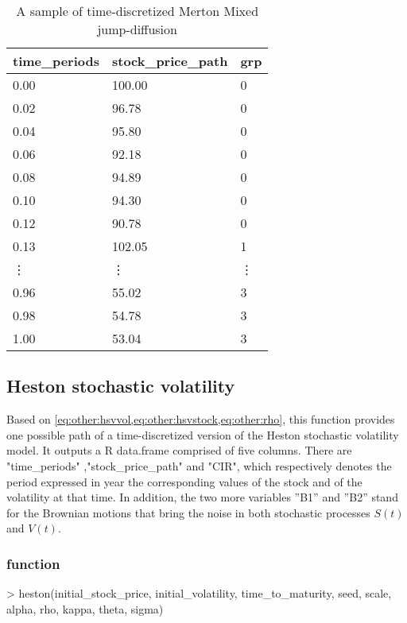 \documentclass[12pt]{report}
\begin{document}
\begin{appendices}
\begin{table}[ht]
\centering
\begin{tabular}{lll}
  \hline
 time\_periods & stock\_price\_path &  grp \\ 
  \hline
   0.00 &100.00 &  0 \\ 
   0.02 &96.78  &  0 \\ 
   0.04 &95.80  &  0 \\ 
   0.06 &92.18  &  0 \\ 
   0.08 &94.89  &  0 \\ 
   0.10 &94.30  &  0 \\ 
   0.12 &90.78  &  0 \\ 
   0.13 &102.05 &  1 \\ 
 \vdots & \vdots & \vdots \\
 0.96 &55.02  &  3 \\ 
 0.98 &54.78  &  3 \\ 
 1.00 &53.04  &  3 \\ 
   \hline
\end{tabular}
\caption{A sample of time-discretized Merton Mixed jump-diffusion}
\end{table}





\subsection{Heston stochastic volatility}
\label{sub:r:time:heston}

Based on \cref{eq:other:hsvvol,eq:other:hsvstock,eq:other:rho}, this function provides one possible path of a time-discretized version of the Heston stochastic volatility model.
It outputs a R data.frame comprised of five columns. 
There are "time\_periods" ,"stock\_price\_path" and "CIR", which respectively denotes the period expressed in year the corresponding values of the stock and of the volatility at that time.
In addition, the two more variables ”B1” and ”B2” stand for the Brownian motions that bring the noise in both stochastic processes $S(t)$ and $V(t)$.

\subsubsection*{function}

\begin{Schunk}
\begin{Sinput}
> heston(initial_stock_price, initial_volatility, time_to_maturity, 
        seed, scale, alpha, rho, kappa, theta, sigma)
\end{Sinput}
\end{Schunk}


\end{appendices}
\end{document}
